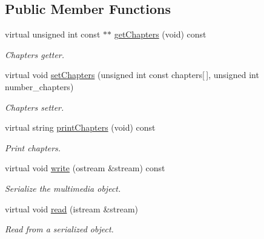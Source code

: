 \subsection*{Public Member Functions}
\begin{DoxyCompactItemize}
\item 
virtual unsigned int const $\ast$$\ast$ \hyperlink{class_film_a23040374eae94998b923d861b8c09c7f}{get\-Chapters} (void) const 
\begin{DoxyCompactList}\small\item\em Chapters getter. \end{DoxyCompactList}\item 
virtual void \hyperlink{class_film_a7d9aab418c08d848d27b976c039c3d03}{set\-Chapters} (unsigned int const chapters\mbox{[}$\,$\mbox{]}, unsigned int number\-\_\-chapters)
\begin{DoxyCompactList}\small\item\em Chapters setter. \end{DoxyCompactList}\item 
virtual string \hyperlink{class_film_aac2a77b0b007b5d69c17b26fb0bde949}{print\-Chapters} (void) const 
\begin{DoxyCompactList}\small\item\em Print chapters. \end{DoxyCompactList}\item 
virtual void \hyperlink{class_film_a8b38978dd0bf6ed844627d8e8b63efbe}{write} (ostream \&stream) const 
\begin{DoxyCompactList}\small\item\em Serialize the multimedia object. \end{DoxyCompactList}\item 
virtual void \hyperlink{class_film_a053b2e4cd4b1e1f8dda7cfb1a45d301c}{read} (istream \&stream)
\begin{DoxyCompactList}\small\item\em Read from a serialized object. \end{DoxyCompactList}\end{DoxyCompactItemize}
